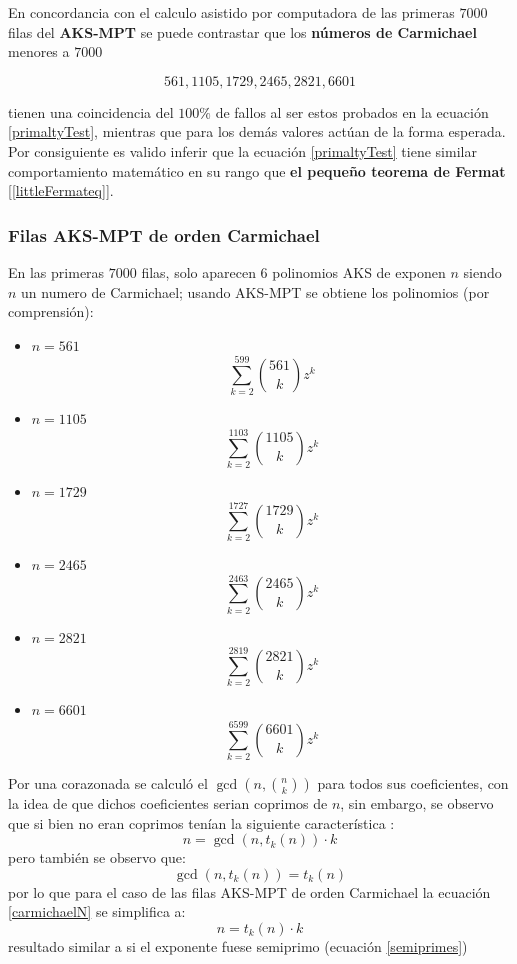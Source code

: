 \documentclass[a4paper, 12pt]{article}
\begin{document}
En concordancia con el calculo asistido por computadora de las primeras $7000$ filas del \textbf{AKS-MPT} se puede contrastar que los \textbf{números de Carmichael} menores a $7000$

\[561, 1105, 1729, 2465, 2821, 6601\]

tienen una coincidencia del\textbf{ $100\%$} de fallos al ser estos probados en la ecuación \ref{primaltyTest}, mientras que para los demás valores actúan de la forma esperada. Por consiguiente es valido inferir que la ecuación \ref{primaltyTest} tiene similar comportamiento matemático en su rango que \textbf{el pequeño teorema de Fermat} [\ref{littleFermateq}].

\subsubsection{Filas AKS-MPT de orden Carmichael}\label{carmichaelDef}

En las primeras $7000$ filas, solo aparecen $6$ polinomios AKS de exponen $n$ siendo $n$ un numero de Carmichael; usando AKS-MPT se obtiene los polinomios (por comprensión):
\begin{itemize}
	\item $n = 561$
	\[ \sum_{k=2}^{599}\binom{561}{k} z^{k}\]
	\item $n = 1105$
	\[ \sum_{k=2}^{1103}\binom{1105}{k} z^{k}\]
	\item $n = 1729$
	\[ \sum_{k=2}^{1727}\binom{1729}{k} z^{k}\]
	\item $n = 2465$
	\[ \sum_{k=2}^{2463}\binom{2465}{k} z^{k}\]
	\item $n = 2821$
	\[ \sum_{k=2}^{2819}\binom{2821}{k} z^{k}\]
	\item $n = 6601$
	\[ \sum_{k=2}^{6599}\binom{6601}{k} z^{k}\]
\end{itemize}

Por una corazonada se calculó el $\gcd(n,\binom{n}{k})$ para todos sus coeficientes, con la idea de que dichos coeficientes serian coprimos de $n$, sin embargo, se observo que si bien no eran coprimos tenían la siguiente característica :
\begin{equation}\label{carmichaelN}
	n = \gcd(n,t_{k}(n))\cdot k
\end{equation}
pero también se observo que:
\[ \gcd(n,t_{k}(n)) = t_{k}(n) \]
por lo que para el caso de las filas AKS-MPT de orden Carmichael la ecuación \ref{carmichaelN} se simplifica a:
\begin{equation}\label{carmichaelGen}
 n = t_{k}(n) \cdot k 
\end{equation}
resultado similar a si el exponente fuese semiprimo (ecuación \ref{semiprimes})
\end{document}

